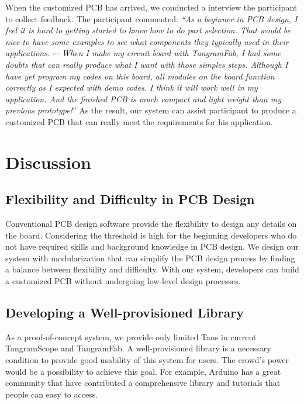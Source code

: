 When the customized PCB has arrived, we conducted a interview the participant to collect feedback.
The participant commented: \textit{``As a beginner in PCB design, I feel it is hard to getting started to know how to do part selection. That would be nice to have some examples to see what components they typically used in their applications. $\cdots$  When I make my circuit board with TangramFab, I had some doubts that can really produce what I want with those simples steps. Although I have yet program my codes on this board, all modules on the board function correctly as I expected with demo codes. I think it will work well in my application. And the finished PCB is much compact and light weight than my previous prototype!}''
As the result, our system can assist participant to produce a customized PCB that can really meet the requirements for his application.



\section{Discussion}

\subsection{Flexibility and Difficulty in PCB Design}
Conventional PCB design software provide the flexibility to design any details on the board.
Considering the threshold is high for the beginning developers who do not have required skills and background knowledge in PCB design.
We design our system with modularization that can simplify the PCB design process by finding a balance between flexibility and difficulty.
With our system, developers can build a customized PCB without undergoing low-level design processes.

\subsection{Developing a Well-provisioned Library}
As a proof-of-concept system, we provide only limited Tans in current TangramScope and TangramFab.
A well-provisioned library is a necessary condition to provide good usability of this system for users.
The crowd's power would be a possibility to achieve this goal.
For example, Arduino has a great community that have contributed a comprehensive library and tutorials that people can easy to access.


